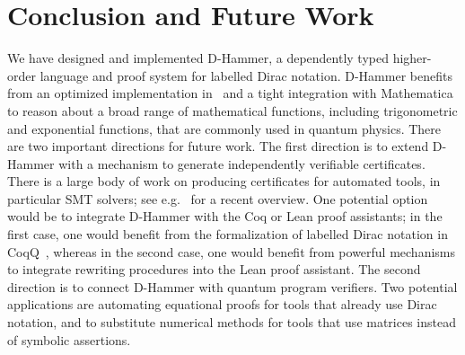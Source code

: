 \section{Conclusion and Future Work}
We have designed and implemented D-Hammer, a dependently typed
higher-order language and proof system for labelled Dirac
notation. D-Hammer benefits from an optimized implementation in
\CC\ and a tight integration with Mathematica to reason about a broad
range of mathematical functions, including trigonometric and
exponential functions, that are commonly used in quantum physics.
There are two important directions for future work. 
The first direction is to extend D-Hammer with a mechanism to
generate independently verifiable certificates.  There is a large body
of work on producing certificates for automated tools, in particular
SMT solvers; see e.g.~\cite{DBLP:journals/cacm/BarbosaBCDKLNNOPRTZ23}
for a recent overview. One potential option would be to integrate
D-Hammer with the Coq or Lean proof assistants; in the first case, one
would benefit from the formalization of labelled Dirac notation in
CoqQ~\cite{Zhou2023}, whereas in the second case, one would benefit
from powerful mechanisms to integrate rewriting procedures into the
Lean proof assistant. The second direction is to connect
D-Hammer with quantum program verifiers. Two potential applications
are automating equational proofs for tools that already use Dirac
notation, and to substitute numerical methods for tools that use
matrices instead of symbolic assertions.






